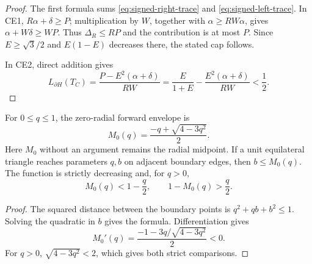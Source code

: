 \begin{proof}
The first formula sums \eqref{eq:signed-right-trace} and
\eqref{eq:signed-left-trace}.  In CE1,
$R\alpha+\delta\ge P$; multiplication by $W$, together with
$\alpha\ge RW\alpha$, gives $\alpha+W\delta\ge WP$.  Thus
$\Delta_R\le RP$ and the contribution is at most $P$.  Since
$E\ge\sqrt3/2$ and $E(1-E)$ decreases there, the stated cap follows.

In CE2, direct addition gives
\[
 L_{\partial H}(T_C)
 =\frac{P-E^2(\alpha+\delta)}{RW}
 =\frac{E}{1+E}-\frac{E^2(\alpha+\delta)}{RW}<\frac12.
\]
\end{proof}

\begin{lemma}
\label{lem:signed-diameter-transfer}
For $0\le q\le1$, the zero-radial forward envelope is
\[
 M_0(q)=\frac{-q+\sqrt{4-3q^2}}2.
\]
Here $M_0$ without an argument remains the radial midpoint.  If a unit
equilateral triangle reaches parameters $q,b$ on adjacent boundary edges,
then $b\le M_0(q)$.  The function is strictly decreasing and, for $q>0$,
\[
 M_0(q)<1-\frac q2,
 \qquad 1-M_0(q)>\frac q2.
\]
\end{lemma}

\begin{proof}
The squared distance between the boundary points is $q^2+qb+b^2\le1$.
Solving the quadratic in $b$ gives the formula.  Differentiation gives
\[
 M_0'(q)=\frac{-1-3q/\sqrt{4-3q^2}}2<0.
\]
For $q>0$, $\sqrt{4-3q^2}<2$, which gives both strict comparisons.
\end{proof}
